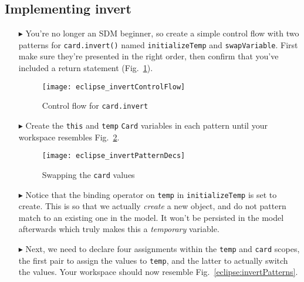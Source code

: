 \newpage
\hypertarget{invertCard tex}{}
\subsection{Implementing invert}
\texHeader

\begin{itemize}

\item[$\blacktriangleright$] You're no longer an SDM beginner, so create a simple control flow with two patterns for \texttt{card.invert()} named
\texttt{initializeTemp} and \texttt{swapVariable}. First make sure they're presented in the right order, then confirm that you've included a return statement
(Fig.~\ref{eclipse:eclipse_invert}).

\begin{figure}[htbp]
\begin{center}
  \texttt{[image: eclipse\_invertControlFlow]}
  \caption{Control flow for \texttt{card.invert}}  
  \label{eclipse:eclipse_invert}
\end{center}
\end{figure}

\item[$\blacktriangleright$] Create the \texttt{this} and \texttt{temp} \texttt{Card} variables in each pattern until your workspace resembles
Fig.~\ref{eclipse:invertPatternsDecs}.

\begin{figure}[htbp]
\begin{center}
  \texttt{[image: eclipse\_invertPatternDecs]}
  \caption{Swapping the \texttt{card} values}  
  \label{eclipse:invertPatternsDecs}
\end{center}
\end{figure}

\item[$\blacktriangleright$] Notice that the binding operator on \texttt{temp} in \texttt{initializeTemp} is set to create. This is so that we actually
\emph{create} a new object, and do not pattern match to an existing one in the model. It won't be persisted in the model afterwards which truly makes this a
\emph{temporary} variable.

\item[$\blacktriangleright$] Next, we need to declare four assignments within the \texttt{temp} and \texttt{card} scopes, the first pair to assign the values to
\texttt{temp}, and the latter to actually switch the values. Your workspace should now resemble Fig.~\ref{eclipse:invertPatterns}.


\end{itemize}
